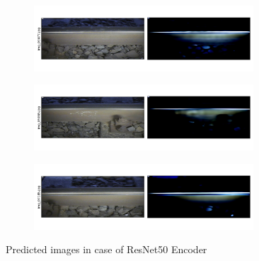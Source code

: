 \begin{figure}[!ht]
    \centering
    \begin{subfigure}{\textwidth}
        \centering
        \includegraphics[width=0.9\textwidth,trim={0 1cm 0 1cm},clip]{./results/resnet50_vgg19/20230514_213740_predict_0.png}
    \end{subfigure}
    \begin{subfigure}{\textwidth}
        \centering
        \includegraphics[width=0.9\textwidth,trim={0 1cm 0 1cm},clip]{./results/resnet50_vgg19/20230514_213740_predict_1.png}
    \end{subfigure}
    \begin{subfigure}{\textwidth}
        \centering
        \includegraphics[width=0.9\textwidth,trim={0 1cm 0 1cm},clip]{./results/resnet50_vgg19/20230514_213740_predict_2.png}
    \end{subfigure}
    \caption{Predicted images in case of ResNet50 Encoder}
    \label{fig:resnet50_examples}
\end{figure}



